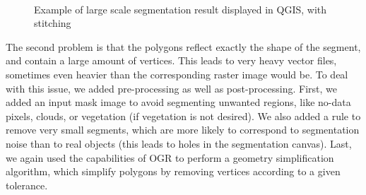 \documentclass{josis}
\begin{document}
\begin{figure}[!htb]
\centering
{}\\
\caption{Example of large scale segmentation result displayed in QGIS, with stitching}
\end{figure}

The second problem is that the polygons reflect exactly the shape of
the segment, and contain a large amount of vertices. This leads to
very heavy vector files, sometimes even heavier than the corresponding
raster image would be. To deal with this issue, we added
pre-processing as well as post-processing. First, we added an input
mask image to avoid segmenting unwanted regions, like no-data pixels,
clouds, or vegetation (if vegetation is not desired). We also added a
rule to remove very small segments, which are more likely to
correspond to segmentation noise than to real objects (this leads to
holes in the segmentation canvas). Last, we again used the
capabilities of OGR to perform a geometry simplification algorithm,
which simplify polygons by removing vertices according to a given
tolerance.
\end{document}
